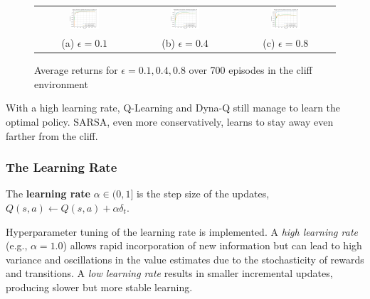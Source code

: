 \documentclass[12pt]{article}
\begin{document}
\begin{figure}[!h]
	\centering
	\begin{tabular}{ccc}
		\includegraphics[width=0.32\textwidth]{figures/epsilon-0-1-cliff.png} &
		\includegraphics[width=0.32\textwidth]{figures/epsilon-0-4-cliff.png} &
		\includegraphics[width=0.32\textwidth]{figures/epsilon-0-8-cliff.png}                                               \\
		(a) $\epsilon = 0.1$                                                  & (b) $\epsilon = 0.4$ & (c) $\epsilon = 0.8$
	\end{tabular}
	\caption{Average returns for $\epsilon = 0.1, 0.4, 0.8$ over 700 episodes in the cliff environment}
	\label{fig:epsilon-cliff}
\end{figure}

With a high learning rate, Q-Learning and Dyna-Q still manage to learn the optimal policy.
SARSA, even more conservatively, learns to stay away even farther from the cliff.


\subsubsection{The Learning Rate}

The \textbf{learning rate} $\alpha \in (0,1]$ is the step size of the updates,
$Q(s, a) \leftarrow Q(s, a) + \alpha \delta_t$.

Hyperparameter tuning of the learning rate is implemented.
A \textit{high learning rate} (e.g., \(\alpha = 1.0\)) allows rapid incorporation of new information but can lead to high variance and oscillations in the value estimates due to the stochasticity of rewards and transitions.
A \textit{low learning rate} results in smaller incremental updates, producing slower but more stable learning.
\end{document}
